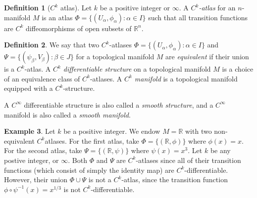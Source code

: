 \documentclass{amsart}
\numberwithin{equation}{section}
\newcommand{\bR}{\mathbb{R}}
\theoremstyle{definition}
\newtheorem{definition}{Definition} [section]
\newtheorem{example}[definition]{Example}
\theoremstyle{theorem}
\begin{document}
\begin{definition}[$C^k$ atlas]
Let $k$ be a positive integer or $\infty$. 
A {\em $C^k$-atlas} for an $n$-manifold $M$ is an atlas $\Phi = \{(U_\alpha, \phi_\alpha):\alpha\in I\}$ such that all transition functions are 
$C^k$ diffeomorphisms of open subsets of $\mathbb{R}^n$. 
\end{definition}

\begin{definition}
We say that two $C^k$-atlases $\Phi = \{(U_\alpha,\phi_\alpha):\alpha\in I \}$ and $\Psi = \{(\psi_\beta, V_\beta): \beta\in J\}$ for a 
topological manifold $M$ are {\em equivalent} if their union is a $C^k$-atlas. 
A {\em $C^k$ differentiable structure} on a topological manifold $M$ is a choice of an equivalence class of $C^k$-atlases. 
A {\em $C^k$ manifold} is a topological manifold equipped with a $C^k$-structure.

A $C^\infty$ differentiable structure is also called a {\em smooth structure}, and a $C^\infty$ manifold
is also called a {\em smooth manifold}. 
\end{definition}

\begin{example} Let $k$ be a positive integer.
We endow $M = \bR$ with two non-equivalent $C^k$atlases. 
For the first atlas, take $\Phi = \{ (\bR, \phi)\}$ where $\phi(x) = x$. 
For the second atlas, take $\Psi = \{ (\bR, \psi) \}$ where $\psi(x) = x^3$. 
Let $k$ be any postive integer, or $\infty$. Both $\Phi$ and $\Psi$ are $C^k$-atlases
since all of their transition functions (which consist of simply the identity map) are $C^k$-differentiable. 
However, their union $\Phi \cup \Psi$ is not a $C^k$-atlas, since the transition function 
$\phi \circ \psi^{-1}(x) = x^{1/3}$ is not $C^k$-differentiable. 
\end{example}
\end{document}
